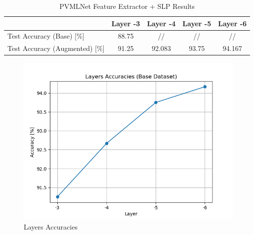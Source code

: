 \documentclass[10pt,a4paper]{report}
\begin{document}
\begin{table}[!ht]
\centering
\begin{tabular}{|l|c|c|c|c|}
\hline
                                   & Layer -3 & Layer -4 & Layer -5 & Layer -6 \\ \hline
Test Accuracy (Base) {[}\%{]}      & 88.75    & //       & //       & //       \\ \hline
Test Accuracy (Augmented) {[}\%{]} & 91.25    & 92.083   & 93.75    & 94.167   \\ \hline
\end{tabular}
\caption{PVMLNet Feature Extractor + SLP Results}
\label{tab:ft-pvmlnet}
\end{table}

\begin{figure}[!ht]
\centering
\includegraphics[width=0.5\linewidth]{layers_acc.png}
\caption{Layers Accuracies}
\label{fig:lacc}
\end{figure} 
\end{document}
